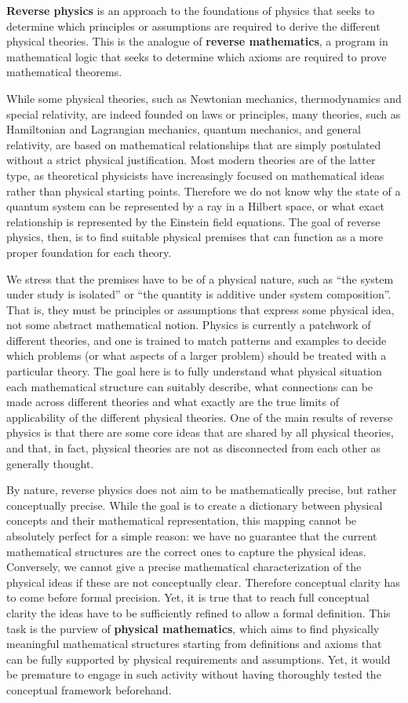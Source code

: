\textbf{Reverse physics} is an approach to the foundations of physics that seeks to determine which principles or assumptions are required to derive the different physical theories. This is the analogue of \textbf{reverse mathematics}, a program in mathematical logic that seeks to determine which axioms are required to prove mathematical theorems.

While some physical theories, such as Newtonian mechanics, thermodynamics and special relativity, are indeed founded on laws or principles, many theories, such as Hamiltonian and Lagrangian mechanics, quantum mechanics, and general relativity, are based on mathematical relationships that are simply postulated without a strict physical justification. Most modern theories are of the latter type, as theoretical physicists have increasingly focused on mathematical ideas rather than physical starting points. Therefore we do not know why the state of a quantum system can be represented by a ray in a Hilbert space, or what exact relationship is represented by the Einstein field equations. The goal of reverse physics, then, is to find suitable physical premises that can function as a more proper foundation for each theory.

We stress that the premises have to be of a physical nature, such as ``the system under study is isolated'' or ``the quantity is additive under system composition''. That is, they must be principles or assumptions that express some physical idea, not some abstract mathematical notion. Physics is currently a patchwork of different theories, and one is trained to match patterns and examples to decide which problems (or what aspects of a larger problem) should be treated with a particular theory. The goal here is to fully understand what physical situation each mathematical structure can suitably describe, what connections can be made across different theories and what exactly are the true limits of applicability of the different physical theories. One of the main results of reverse physics is that there are some core ideas that are shared by all physical theories, and that, in fact, physical theories are not as disconnected from each other as generally thought.

By nature, reverse physics does not aim to be mathematically precise, but rather conceptually precise. While the goal is to create a dictionary between physical concepts and their mathematical representation, this mapping cannot be absolutely perfect for a simple reason: we have no guarantee that the current mathematical structures are the correct ones to capture the physical ideas. Conversely, we cannot give a precise mathematical characterization of the physical ideas if these are not conceptually clear. Therefore conceptual clarity has to come before formal precision. Yet, it is true that to reach full conceptual clarity the ideas have to be sufficiently refined to allow a formal definition. This task is the purview of \textbf{physical mathematics}, which aims to find physically meaningful mathematical structures starting from definitions and axioms that can be fully supported by physical requirements and assumptions. Yet, it would be premature to engage in such activity without having thoroughly tested the conceptual framework beforehand.
